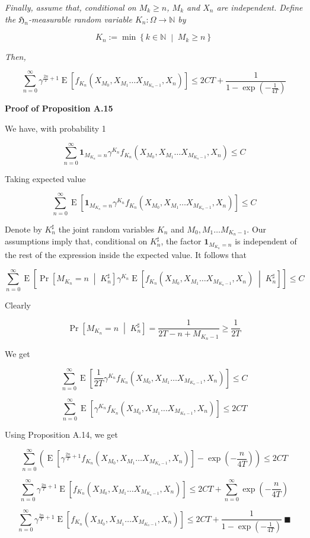 \documentclass[a4paper]{article}
\newcommand{\Co}[1]{}
\newcommand{\AP}[1]{\left(#1\right)}
\newcommand{\AB}[1]{\left[#1\right]}
\newcommand{\ABM}[2]{\left[#1\;\middle\vert\;#2\right]}
\newcommand{\ACM}[2]{\left\{#1\;\middle\vert\;#2\right\}}
\newcommand{\CP}[3]{\underset{#1}{\operatorname{Pr}}\ABM{#2}{#3}}
\newcommand{\E}[1]{\operatorname{E}\AB{#1}}
\newcommand{\CE}[3]{\underset{#1}{\operatorname{E}}\ABM{#2}{#3}}
\newcommand{\Nats}{\mathbb{N}}
\newcommand{\KD}[1]{\boldsymbol{1}_{#1}}
\newcommand{\Fi}{\mathfrak{H}}
\begin{document}
\textit{Finally, assume that, conditional on $M_k\geq n$, $M_k$ and $X_{n}$ are independent. Define the $\Fi_n$-measurable random variable $K_n:\Omega\rightarrow\Nats$ by}\Co{i}

$$K_n:=\min\ACM{k\in\Nats}{M_k\geq n}$$

\textit{Then,}\Co{i}

$$\sum_{n=0}^\infty\gamma^{\frac{2n}{T}+1}\E{f_{K_n}\AP{X_{M_0},X_{M_1}\ldots X_{M_{K_n-1}},X_n}}\leq 2CT+\frac{1}{1-\exp\AP{-\frac{1}{4T}}}$$

\textbf{Proof of Proposition A.15}\Co{b}

We have, with probability 1

$$\sum_{n=0}^\infty\KD{M_{K_n}=n}\gamma^{K_n}f_{K_n}\AP{X_{M_0},X_{M_1}\ldots X_{M_{K_n-1}},X_n} \leq C$$

Taking expected value

$$\sum_{n=0}^\infty\E{\KD{M_{K_n}=n}\gamma^{K_n}f_{K_n}\AP{X_{M_0},X_{M_1}\ldots X_{M_{K_n-1}},X_n}} \leq C$$

Denote by $K_n^\sharp$ the joint random variables $K_n$ and $M_0,M_1\ldots M_{K_n-1}$. Our assumptions imply that, conditional on $K_n^\sharp$, the factor $\KD{M_{K_n}=n}$ is independent of the rest of the expression inside the expected value. It follows that

$$\sum_{n=0}^\infty\E{\CP{}{M_{K_n}=n}{K_n^\sharp}\gamma^{K_n}\CE{}{f_{K_n}\AP{X_{M_0},X_{M_1}\ldots X_{M_{K_n-1}},X_n}}{K_n^\sharp}} \leq C$$

Clearly

$$\CP{}{M_{K_n}=n}{K_n^\sharp}=\frac{1}{2T-n+M_{K_n-1}}\geq\frac{1}{2T}$$

We get

$$\sum_{n=0}^\infty\E{\frac{1}{2T}\gamma^{K_n}f_{K_n}\AP{X_{M_0},X_{M_1}\ldots X_{M_{K_n-1}},X_n}} \leq C$$

$$\sum_{n=0}^\infty\E{\gamma^{K_n}f_{K_n}\AP{X_{M_0},X_{M_1}\ldots X_{M_{K_n-1}},X_n}} \leq 2CT$$

Using Proposition A.14, we get

$$\sum_{n=0}^\infty\AP{\E{\gamma^{\frac{2n}{T}+1}f_{K_n}\AP{X_{M_0},X_{M_1}\ldots X_{M_{K_n-1}},X_n}}-\exp\AP{-\frac{n}{4T}}} \leq 2CT$$

$$\sum_{n=0}^\infty\gamma^{\frac{2n}{T}+1}\E{f_{K_n}\AP{X_{M_0},X_{M_1}\ldots X_{M_{K_n-1}},X_n}} \leq 2CT+\sum_{n=0}^\infty\exp\AP{-\frac{n}{4T}}$$

$$\sum_{n=0}^\infty\gamma^{\frac{2n}{T}+1}\E{f_{K_n}\AP{X_{M_0},X_{M_1}\ldots X_{M_{K_n-1}},X_n}} \leq 2CT+\frac{1}{1-\exp\AP{-\frac{1}{4T}}}\ \blacksquare$$
\end{document}
